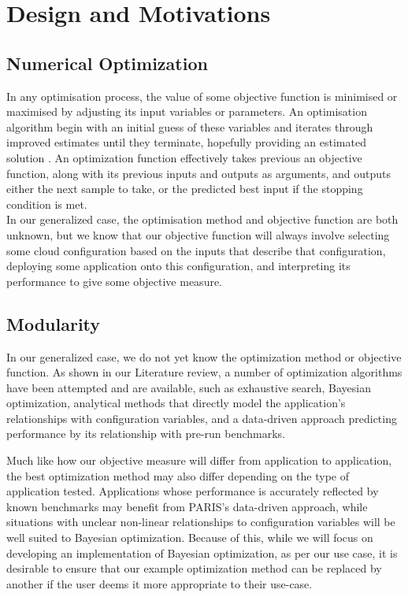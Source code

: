 \documentclass{report}
\begin{document}
\chapter{Design and Motivations}
\section{Numerical Optimization}
In any optimisation process, the value of some objective function is minimised or maximised by adjusting its input variables or parameters. An optimisation algorithm begin with an initial guess of these variables and iterates through improved estimates until they terminate, hopefully providing an estimated solution \cite{Nocedal2006}. An optimization function effectively takes previous an objective function, along with its previous inputs and outputs as arguments, and outputs either the next sample to take, or the predicted best input if the stopping condition is met. \\
In our generalized case, the optimisation method and objective function are both unknown, but we know that our objective function will always involve selecting some cloud configuration based on the inputs that describe that configuration, deploying some application onto this configuration, and interpreting its performance to give some objective measure.
\section{Modularity}
In our generalized case, we do not yet know the optimization method or objective function. As shown in our Literature review, a number of optimization algorithms have been attempted and are available, such as exhaustive search, Bayesian optimization\cite{Alipourfard2017}, analytical methods that directly model the application's relationships with configuration variables\cite{Venkataraman2016}, and a data-driven approach predicting performance by its relationship with pre-run benchmarks\cite{Yadwadkar2017}.

Much like how our objective measure will differ from application to application, the best optimization method may also differ depending on the type of application tested. Applications whose performance is accurately reflected by known benchmarks may benefit from PARIS's data-driven approach, while situations with unclear non-linear relationships to configuration variables will be well suited to Bayesian optimization. Because of this, while we will focus on developing an implementation of Bayesian optimization, as per our use case, it is desirable to ensure that our example optimization method can be replaced by another if the user deems it more appropriate to their use-case.
\end{document}
